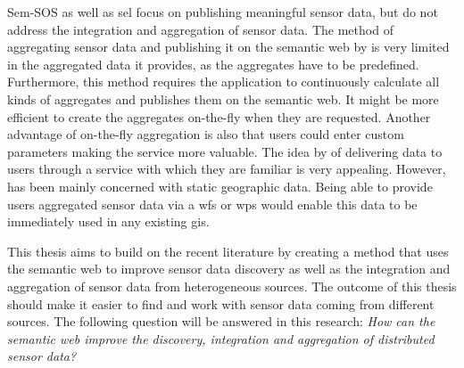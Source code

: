 Sem-SOS \citep{SSW:Henson, SSW:Pschorr} as well as \ac{sel} \citep{SSW:Janowicz} focus on publishing meaningful sensor data, but do not address the integration and aggregation of sensor data. The method of aggregating sensor data and publishing it on the semantic web by \cite{SSW:Stasch} is very limited in the aggregated data it provides, as the aggregates have to be predefined. Furthermore, this method requires the application to continuously calculate all kinds of aggregates and publishes them on the semantic web. It might be more efficient to create the aggregates on-the-fly when they are requested. Another advantage of on-the-fly aggregation is also that users could enter custom parameters making the service more valuable. The idea by \cite{SW:Jones} of delivering data to users through a service with which they are familiar is very appealing. However, \cite{SW:Jones} has been mainly concerned with static geographic data. Being able to provide users aggregated sensor data via a \ac{wfs} or \ac{wps} would enable this data to be immediately used in any existing \ac{gis}.

This thesis aims to build on the recent literature by creating a method that uses the semantic web to improve sensor data discovery as well as the integration and aggregation of sensor data from heterogeneous sources. The outcome of this thesis should make it easier to find and work with sensor data coming from different sources. The following question will be answered in this research:   
\textit{How can the semantic web improve the discovery, integration and aggregation of distributed sensor data?} 












































\iffalse

